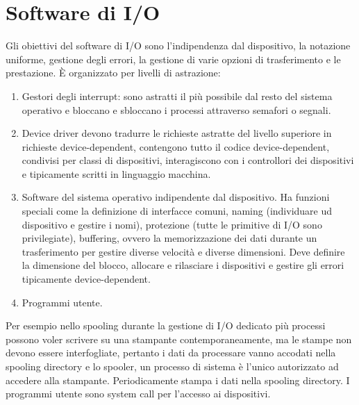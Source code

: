 \section{Software di I/O}
Gli obiettivi del software di I/O sono l'indipendenza dal dispositivo, la notazione uniforme, gestione degli errori, la gestione di varie opzioni di trasferimento e le prestazione. \`E
organizzato per livelli di astrazione: 
\begin{enumerate}
	\item Gestori degli interrupt: sono astratti il pi\`u possibile dal resto del sistema operativo e bloccano e sbloccano i processi attraverso semafori o segnali.
	\item Device driver devono tradurre le richieste astratte del livello superiore in richieste device-dependent, contengono tutto il codice device-dependent, condivisi per classi
		di dispositivi, interagiscono con i controllori dei dispositivi e tipicamente scritti in linguaggio macchina. 
	\item Software del sistema operativo indipendente dal dispositivo. Ha funzioni speciali come la definizione di interfacce comuni, naming (individuare ud dispositivo e gestire i 
		nomi), protezione (tutte le primitive di I/O sono privilegiate), buffering, ovvero la memorizzazione dei dati durante un trasferimento per gestire diverse velocit\`a 
		e diverse dimensioni. Deve definire la dimensione del blocco, allocare e rilasciare i dispositivi e gestire gli errori tipicamente device-dependent. 
	\item Programmi utente. 
\end{enumerate}
Per esempio nello spooling durante la gestione di I/O dedicato pi\`u processi possono voler scrivere su una stampante contemporaneamente, ma le stampe non devono essere interfogliate, 
pertanto i dati da processare vanno accodati nella spooling directory e lo spooler, un processo di sistema \`e l'unico autorizzato ad accedere alla stampante. Periodicamente stampa i 
dati nella spooling directory. I programmi utente sono system call per l'accesso ai dispositivi. 
